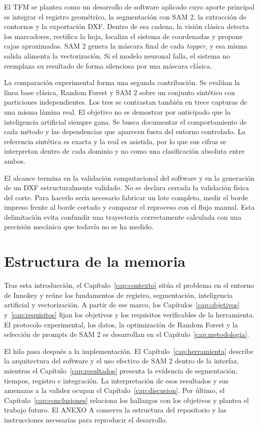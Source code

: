 El TFM se plantea como un desarrollo de software aplicado cuyo aporte principal es integrar el registro geométrico, la segmentación con SAM 2, la extracción de contornos y la exportación DXF. Dentro de esa cadena, la visión clásica detecta los marcadores, rectifica la hoja, localiza el sistema de coordenadas y propone cajas aproximadas. SAM 2 genera la máscara final de cada \textit{topper}, y esa misma salida alimenta la vectorización. Si el modelo neuronal falla, el sistema no reemplaza su resultado de forma silenciosa por una máscara clásica.

La comparación experimental forma una segunda contribución. Se evalúan la línea base clásica, Random Forest y SAM 2 sobre un conjunto sintético con particiones independientes. Los tres se contrastan también en trece capturas de una misma lámina real. El objetivo no es demostrar por anticipado que la inteligencia artificial siempre gana. Se busca documentar el comportamiento de cada método y las dependencias que aparecen fuera del entorno controlado. La referencia sintética es exacta y la real es asistida, por lo que sus cifras se interpretan dentro de cada dominio y no como una clasificación absoluta entre ambos.

El alcance termina en la validación computacional del software y en la generación de un DXF estructuralmente validado. No se declara cerrada la validación física del corte. Para hacerlo sería necesario fabricar un lote completo, medir el borde impreso frente al borde cortado y comparar el reproceso con el flujo manual. Esta delimitación evita confundir una trayectoria correctamente calculada con una precisión mecánica que todavía no se ha medido.

\section{Estructura de la memoria}

Tras esta introducción, el Capítulo~\ref{cap:contexto} sitúa el problema en el entorno de Innokey y reúne los fundamentos de registro, segmentación, inteligencia artificial y vectorización. A partir de ese marco, los Capítulos~\ref{cap:objetivos} y~\ref{cap:requisitos} fijan los objetivos y los requisitos verificables de la herramienta. El protocolo experimental, los datos, la optimización de Random Forest y la selección de prompts de SAM 2 se desarrollan en el Capítulo~\ref{cap:metodologia}.

El hilo pasa después a la implementación. El Capítulo~\ref{cap:herramienta} describe la arquitectura del software y el uso efectivo de SAM 2 dentro de la interfaz, mientras el Capítulo~\ref{cap:resultados} presenta la evidencia de segmentación, tiempos, registro e integración. La interpretación de esos resultados y sus amenazas a la validez ocupan el Capítulo~\ref{cap:discusion}. Por último, el Capítulo~\ref{cap:conclusiones} relaciona los hallazgos con los objetivos y plantea el trabajo futuro. El ANEXO A conserva la estructura del repositorio y las instrucciones necesarias para reproducir el desarrollo.
